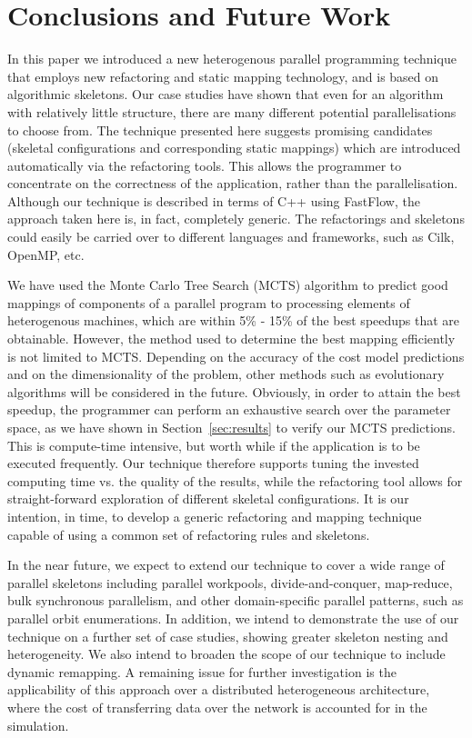 \documentclass[smallextended]{svjour3}
\begin{document}
\section{Conclusions and Future Work}
\noindent
In this paper we introduced a new heterogenous parallel programming technique that employs new
refactoring and static mapping technology, and is based on algorithmic
skeletons. Our case studies have shown that even for an algorithm with relatively little structure, there are many different
 potential parallelisations to choose from. The technique presented here suggests promising candidates (skeletal configurations and corresponding static mappings) which are introduced
automatically via the refactoring tools.
This allows the programmer to concentrate on 
the correctness of the application, rather than the parallelisation. 
Although our technique is described in terms of C++ using FastFlow, the approach taken here is,
in fact, completely generic. The refactorings and skeletons could easily be carried over to different languages and frameworks, such 
as Cilk, OpenMP, etc. 

We have used the Monte Carlo Tree Search (MCTS) algorithm to predict
good mappings of components of a parallel program to processing
elements of heterogenous machines, which are within 5\% - 15\% of the best speedups that are obtainable. 
However, the method used to determine the best mapping efficiently is not limited to MCTS. Depending on the accuracy of the cost model predictions and on the dimensionality of the problem, other methods such as evolutionary algorithms will be considered in the future.  
Obviously, in order to attain the best speedup, the programmer can perform an exhaustive search over the parameter space, as we have shown in Section~\ref{sec:results} to verify our MCTS predictions. This is compute-time intensive, but worth while if the application is to be executed frequently. 
Our technique therefore supports tuning the invested computing time vs. the quality of the results, while the refactoring tool allows for straight-forward exploration of different skeletal configurations. It is our
 intention, in time, to develop
a generic refactoring and mapping technique capable of using a common set of refactoring rules and skeletons.  

In the near future, we expect to extend our technique to cover a wide range of parallel skeletons
including parallel workpools, divide-and-conquer, map-reduce, bulk synchronous parallelism, and other domain-specific
parallel patterns, such as parallel orbit enumerations.
In addition, we intend to demonstrate the use of our technique on a further set of case studies, showing greater skeleton nesting and  heterogeneity. We also intend to broaden the scope of our technique to include dynamic remapping. 
A remaining issue for further investigation is the applicability of this approach over a distributed heterogeneous architecture, where the cost of transferring data over the network is accounted for in the simulation. 
\end{document}
